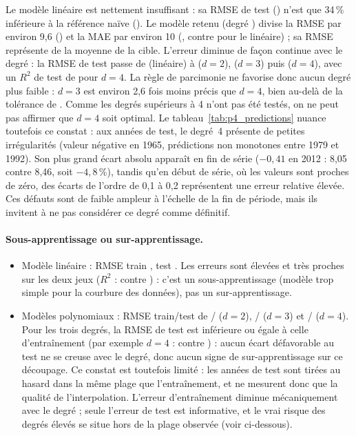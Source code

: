 \documentclass[11pt,a4paper]{report}
\begin{document}
Le modèle linéaire est nettement insuffisant : sa RMSE de test (\PartFourLinearRMSE{}) n'est que 34\,\% inférieure à la référence naïve (\PartFourBaselineRMSE{}). Le modèle retenu (degré \PartFourChosenDegree{}) divise la RMSE par environ 9,6 (\PartFourChosenRMSE{}) et la MAE par environ 10 (\PartFourChosenMAE{}, contre \PartFourLinearMAE{} pour le linéaire) ; sa RMSE représente \PartFourChosenRMSEPct{} de la moyenne de la cible. L'erreur diminue de façon continue avec le degré : la RMSE de test passe de \PartFourLinearRMSE{} (linéaire) à \PartFourPolyTwoRMSE{} ($d=2$), \PartFourPolyThreeRMSE{} ($d=3$) puis \PartFourPolyFourRMSE{} ($d=4$), avec un $R^2$ de test de \PartFourPolyFourRTwo{} pour $d=4$. La règle de parcimonie ne favorise donc aucun degré plus faible : $d=3$ est environ 2,6 fois moins précis que $d=4$, bien au-delà de la tolérance de \PartFourTolPct{}. Comme les degrés supérieurs à 4 n'ont pas été testés, on ne peut pas affirmer que $d=4$ soit optimal. Le tableau~\ref{tab:p4_predictions} nuance toutefois ce constat : aux années de test, le degré~4 présente de petites irrégularités (valeur négative en 1965, prédictions non monotones entre 1979 et 1992). Son plus grand écart absolu apparaît en fin de série ($-0{,}41$ en 2012 : 8,05 contre 8,46, soit $-4{,}8$\,\%), tandis qu'en début de série, où les valeurs sont proches de zéro, des écarts de l'ordre de 0,1 à 0,2 représentent une erreur relative élevée. Ces défauts sont de faible ampleur à l'échelle de la fin de période, mais ils invitent à ne pas considérer ce degré comme définitif.

\paragraph{Sous-apprentissage ou sur-apprentissage.}
\begin{itemize}
  \item Mod\`ele lin\'eaire : RMSE train \PartFourLinearTrainRMSE{}, test \PartFourLinearRMSE{}.
        Les erreurs sont élevées et très proches sur les deux jeux ($R^2$ : \PartFourLinearTrainRTwo{} contre \PartFourLinearRTwo{}) : c'est un sous-apprentissage (modèle trop simple pour la courbure des données), pas un sur-apprentissage.
  \item Mod\`eles polynomiaux : RMSE train/test de \PartFourPolyTwoTrainRMSE{}/\PartFourPolyTwoRMSE{}
        ($d=2$), \PartFourPolyThreeTrainRMSE{}/\PartFourPolyThreeRMSE{} ($d=3$) et
        \PartFourPolyFourTrainRMSE{}/\PartFourPolyFourRMSE{} ($d=4$).
        Pour les trois degrés, la RMSE de test est inférieure ou égale à celle d'entraînement (par exemple $d=4$ : \PartFourPolyFourRMSE{} contre \PartFourPolyFourTrainRMSE{}) : aucun écart défavorable au test ne se creuse avec le degré, donc aucun signe de sur-apprentissage sur ce découpage. Ce constat est toutefois limité : les \PartFourNTest{} années de test sont tirées au hasard dans la même plage que l'entraînement, et ne mesurent donc que la qualité de l'interpolation. L'erreur d'entraînement diminue mécaniquement avec le degré ; seule l'erreur de test est informative, et le vrai risque des degrés élevés se situe hors de la plage observée (voir ci-dessous).
\end{itemize}
\end{document}
